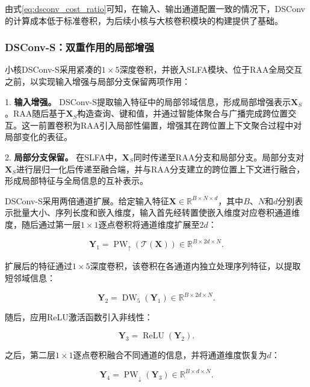 由式\eqref{eq:dsconv_cost_ratio}可知，在输入、输出通道配置一致的情况下，DSConv的计算成本低于标准卷积，为后续小核与大核卷积模块的构建提供了基础。

\subsubsection{DSConv-S：双重作用的局部增强}

小核DSConv-S采用紧凑的$1\times5$深度卷积，并嵌入SLFA模块、位于RAA全局交互之前，以实现输入增强与局部分支保留两项作用：

1. \textbf{输入增强。} DSConv-S提取输入特征中的局部邻域信息，形成局部增强表示$\mathbf X_S$。RAA随后基于$\mathbf X_S$构造查询、键和值，并通过智能体聚合与广播完成跨位置交互。这一前置卷积为RAA引入局部性偏置，增强其在跨位置上下文聚合过程中对局部变化的表征。

2. \textbf{局部分支保留。} 在SLFA中，$\mathbf X_S$同时传递至RAA分支和局部分支。局部分支对$\mathbf X_S$进行层归一化后传递至融合端，并与RAA分支建立的跨位置上下文进行融合，形成局部特征与全局信息的互补表示。

DSConv-S采用两倍通道扩展。给定输入特征$\mathbf X\in\mathbb R^{B\times N\times d}$，其中$B$、$N$和$d$分别表示批量大小、序列长度和嵌入维度，输入首先经转置使嵌入维度对应卷积通道维度，随后通过第一层$1\times1$逐点卷积将通道维度扩展至$2d$：

\begin{equation}
\mathbf Y_1
=
\operatorname{PW}_{\uparrow}
\left(
\mathcal T(\mathbf X)
\right)
\in\mathbb R^{B\times 2d\times N}.
\end{equation}

扩展后的特征通过$1\times5$深度卷积，该卷积在各通道内独立处理序列特征，以提取短邻域信息：

\begin{equation}
\mathbf Y_2
=
\operatorname{DW}_{5}(\mathbf Y_1)
\in\mathbb R^{B\times 2d\times N}.
\end{equation}

随后，应用ReLU激活函数引入非线性：

\begin{equation}
\mathbf Y_3
=
\operatorname{ReLU}(\mathbf Y_2).
\end{equation}

之后，第二层$1\times1$逐点卷积融合不同通道的信息，并将通道维度恢复为$d$：

\begin{equation}
\mathbf Y_4
=
\operatorname{PW}_{\downarrow}(\mathbf Y_3)
\in\mathbb R^{B\times d\times N}.
\end{equation}

